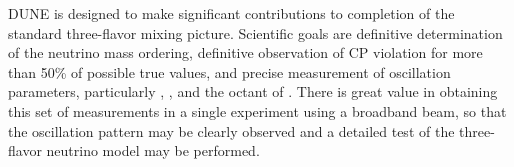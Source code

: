 
DUNE is designed to make significant contributions to completion of the standard three-flavor 
mixing picture. Scientific goals are definitive determination of the neutrino mass ordering, definitive observation of CP violation for more than 50\% of possible true \deltacp values,  
and precise measurement of oscillation parameters, particularly \deltacp, , and the octant of . There is 
great value in obtaining this set of measurements in a single experiment using a broadband beam, so that the oscillation pattern may be clearly observed and a detailed test of the three-flavor neutrino model may be performed. 
